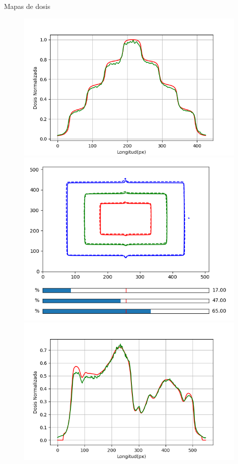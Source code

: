 \documentclass[12pt]{beamer}
\begin{document}
\begin{frame}{Mapas de dosis}
\begin{figure}[htp]%
	\centering
	\begin{minipage}{0.45\textwidth}
		\includegraphics[width=\textwidth]{images/perfilPiramideNormalizado.png}
	\end{minipage}\hfill
	\begin{minipage}{0.45\textwidth}
		\includegraphics[width=\textwidth]{images/isodosisPiramide2.png}
	\end{minipage}\par
	\begin{minipage}{0.45\textwidth}
		\includegraphics[width=\textwidth]{images/perfilDosisMama.png}

\end{minipage}
\end{figure}
\end{frame}
\end{document}
